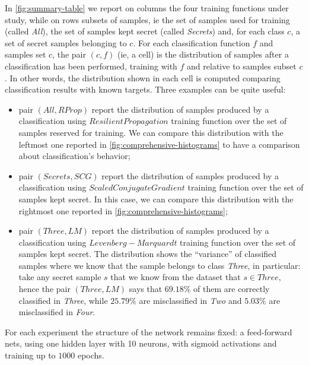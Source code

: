 \documentclass[10pt,a4paper]{article}
\begin{document}
    In \autoref{fig:summary-table} we report on columns the four training functions under study,
    while on rows subsets of samples, ie the set of samples used for training (called \emph{All}), 
    the set of samples kept secret (called \emph{Secrets}) and, for each class $c$, a set of secret samples belonging to $c$.
    For each classification function $f$ and samples set $c$, the pair $(c, f)$ (ie, a cell) 
    is the distribution of samples after a classification has been performed, training with $f$ and
    relative to samples subset $c$. In other words, the distribution shown in each cell is
    computed comparing classification results with known targets. Three examples 
    can be quite useful:
    \begin{itemize}
        \item pair $(All, RProp)$ report the distribution of samples produced by a classification
        using $Resilient Propagation$ training function over the set of samples reserved for training.
        We can compare this distribution with the leftmost one reported in \autoref{fig:comprehensive-histograms}
        to have a comparison about classification's behavior;

        \item pair $(Secrets, SCG)$ report the distribution of samples produced by a classification
        using $Scaled Conjugate Gradient$ training function over the set of samples kept secret.
        In this case, we can compare this distribution with the rightmost one reported in \autoref{fig:comprehensive-histograms};

        \item pair $(Three, LM)$ report the distribution of samples produced by a classification
        using $Levenberg-Marquardt$ training function over the set of samples kept secret.
        The distribution shows the ``variance'' of classified samples where we know that the
        sample belongs to class \emph{Three}, in particular: take any secret sample $s$ that we know from the 
        dataset that $s \in Three$, hence the pair $(Three, LM)$ says that $69.18 \%$ of them
        are correctly classified in \emph{Three}, while $25.79 \%$ are misclassified in \emph{Two} and 
        $5.03 \%$ are misclassified in \emph{Four}.

    \end{itemize}
    
    For each experiment the structure of the network remains fixed: a feed-forward nets, using one 
    hidden layer with 10 neurons, with sigmoid activations and training up to $1000$ epochs.
\end{document}
